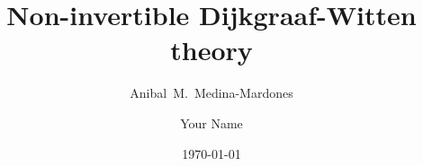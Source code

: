 \documentclass{amsart}
\title[Short title]{Non-invertible Dijkgraaf-Witten theory}
\author[A.~Medina-Mardones]{Anibal~M.~Medina-Mardones}
\author[short version]{Your Name}
\date{\today}
\begin{document}
	
	\maketitle
	
	
	\nocite{*}
	\sloppy
	\printbibliography
\end{document}
